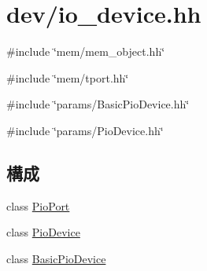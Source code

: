 \hypertarget{io__device_8hh}{
\section{dev/io\_\-device.hh}
\label{io__device_8hh}
}
{\ttfamily \#include \char`\"{}mem/mem\_\-object.hh\char`\"{}}\par
{\ttfamily \#include \char`\"{}mem/tport.hh\char`\"{}}\par
{\ttfamily \#include \char`\"{}params/BasicPioDevice.hh\char`\"{}}\par
{\ttfamily \#include \char`\"{}params/PioDevice.hh\char`\"{}}\par
\subsection*{構成}
\begin{DoxyCompactItemize}
\item 
class \hyperlink{classPioPort}{PioPort}
\item 
class \hyperlink{classPioDevice}{PioDevice}
\item 
class \hyperlink{classBasicPioDevice}{BasicPioDevice}
\end{DoxyCompactItemize}
